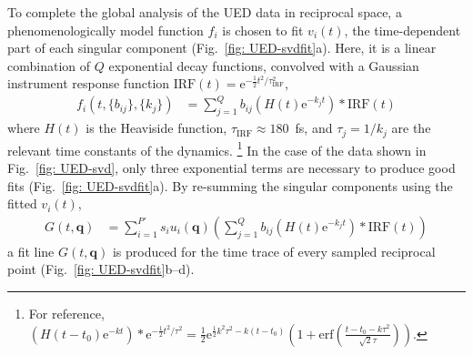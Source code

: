 To complete the global analysis of the UED data in reciprocal space,
a phenomenologically model function $f_i$ is chosen to fit $v_i(t)$,
the time-dependent part of each singular component (Fig.~\ref{fig: UED-svdfit}a).
Here, it is a linear combination of $Q$ exponential decay functions,
convolved with a Gaussian instrument response function
$\textrm{IRF}(t) = \text{e}^{- \frac{1}{2} t^2/\tau_\text{IRF}^2}$,
\begin{equation}
  \begin{aligned}
    f_i(t, \{ b_{i j}\}, \{k_j\})
        & = \sum_{j = 1}^Q b_{i j} \left( H(t) \text{e}^{-k_j t}\right) \ast \text{IRF}(t)
  \end{aligned}
  \label{eq: UED-GA}
\end{equation}
%
where $H(t)$ is the Heaviside function, $\tau_\text{IRF} \approx 180$~fs,
and $\tau_j = 1/k_j$ are the relevant time constants of the dynamics.%
\footnote{For reference,
$ \left( H(t - t_0) \text{e}^{-k t}\right) \ast \text{e}^{- \frac{1}{2} t^2/\tau^2} =
\frac{1}{2} \text{e}^{\frac{1}{2} k^2 \tau^2 - k (t - t_0)}
\left( 1 +
\text{erf}\left( \frac{t - t_0 - k \tau^2}{\sqrt{2} \tau} \right)
\right)$.
} In the case of the data shown in Fig.~\ref{fig: UED-svd},
only three exponential terms are necessary to produce good fits (Fig.~\ref{fig: UED-svdfit}a).
By re-summing the singular components using the fitted $v_i(t)$,
%
\begin{equation}
  \begin{aligned}
    G(t, \boldsymbol{q})
      & = \sum_{i = 1}^{P'} s_i u_i(\boldsymbol{q})
        \left( \sum_{j = 1}^Q b_{i j} \left( H(t) \text{e}^{-k_j t}\right) \ast \text{IRF}(t) \right)
  \end{aligned}
\end{equation}
%
a fit line $G(t, \boldsymbol{q})$ is produced for the time trace of
every sampled reciprocal point (Fig.~\ref{fig: UED-svdfit}b--d).

